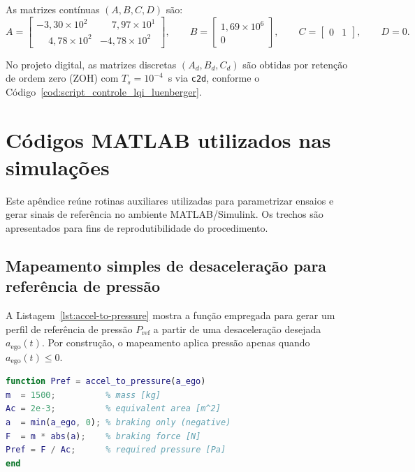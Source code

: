 As matrizes contínuas $(A,B,C,D)$ são:
\begin{equation}
    A =
    \begin{bmatrix}
        -3{,}30\times 10^{2}           & \phantom{-}7{,}97\times 10^{1} \\
        \phantom{-}4{,}78\times 10^{2} & -4{,}78\times 10^{2}
    \end{bmatrix},
    \qquad
    B =
    \begin{bmatrix}
        1{,}69\times 10^{6} \\
        0
    \end{bmatrix},
    \qquad
    C =
    \begin{bmatrix}
        0 & 1
    \end{bmatrix},
    \qquad
    D = 0.
\end{equation}

No projeto digital, as matrizes discretas $(A_d,B_d,C_d)$ são obtidas por retenção de ordem zero (ZOH) com $T_s=10^{-4}$~s via \texttt{c2d}, conforme o Código~\ref{cod:script_controle_lqi_luenberger}.


\chapter{Códigos MATLAB utilizados nas simulações}
\label{ap:codigos-matlab}

Este apêndice reúne rotinas auxiliares utilizadas para parametrizar ensaios e gerar sinais de referência no ambiente MATLAB/Simulink. Os trechos são apresentados para fins de reprodutibilidade do procedimento.

\section{Mapeamento simples de desaceleração para referência de pressão}
\label{ap:codigos-matlab-mapeamento}

A Listagem~\ref{lst:accel-to-pressure} mostra a função empregada para gerar um perfil de referência de pressão $P_{\mathrm{ref}}$ a partir de uma desaceleração desejada $a_{\mathrm{ego}}(t)$. Por construção, o mapeamento aplica pressão apenas quando $a_{\mathrm{ego}}(t)\le 0$.

\begin{lstlisting}[language=Matlab,caption={Funcao para converter desaceleracao em referencia de pressao.},label={lst:accel-to-pressure}]
function Pref = accel_to_pressure(a_ego)
m  = 1500;          % mass [kg]
Ac = 2e-3;          % equivalent area [m^2]
a  = min(a_ego, 0); % braking only (negative)
F  = m * abs(a);    % braking force [N]
Pref = F / Ac;      % required pressure [Pa]
end
\end{lstlisting}

